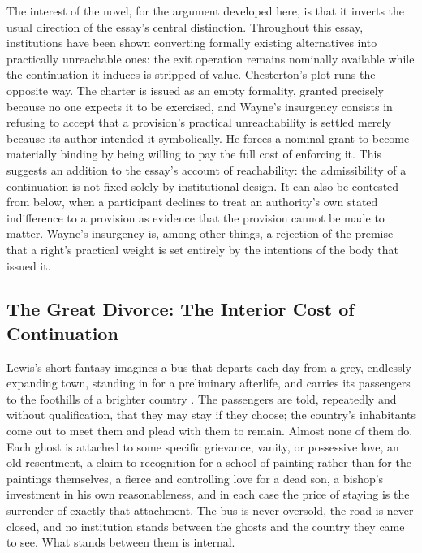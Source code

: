 \documentclass[11pt]{article}
\begin{document}
The interest of the novel, for the argument developed here, is that it inverts the usual direction of the essay's central distinction. Throughout this essay, institutions have been shown converting formally existing alternatives into practically unreachable ones: the exit operation remains nominally available while the continuation it induces is stripped of value. Chesterton's plot runs the opposite way. The charter is issued as an empty formality, granted precisely because no one expects it to be exercised, and Wayne's insurgency consists in refusing to accept that a provision's practical unreachability is settled merely because its author intended it symbolically. He forces a nominal grant to become materially binding by being willing to pay the full cost of enforcing it. This suggests an addition to the essay's account of reachability: the admissibility of a continuation is not fixed solely by institutional design. It can also be contested from below, when a participant declines to treat an authority's own stated indifference to a provision as evidence that the provision cannot be made to matter. Wayne's insurgency is, among other things, a rejection of the premise that a right's practical weight is set entirely by the intentions of the body that issued it.

\subsection{The Great Divorce: The Interior Cost of Continuation}

Lewis's short fantasy imagines a bus that departs each day from a grey, endlessly expanding town, standing in for a preliminary afterlife, and carries its passengers to the foothills of a brighter country \parencite{lewis1945greatdivorce}. The passengers are told, repeatedly and without qualification, that they may stay if they choose; the country's inhabitants come out to meet them and plead with them to remain. Almost none of them do. Each ghost is attached to some specific grievance, vanity, or possessive love, an old resentment, a claim to recognition for a school of painting rather than for the paintings themselves, a fierce and controlling love for a dead son, a bishop's investment in his own reasonableness, and in each case the price of staying is the surrender of exactly that attachment. The bus is never oversold, the road is never closed, and no institution stands between the ghosts and the country they came to see. What stands between them is internal.
\end{document}
